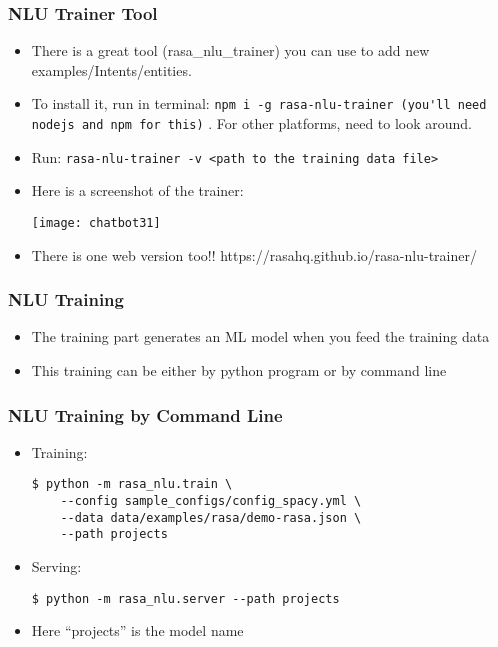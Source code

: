  \begin{frame}[fragile]\frametitle{NLU Trainer Tool}
\begin{itemize}
\item There is a great tool (rasa\_nlu\_trainer) you can use to add new examples/Intents/entities.
\item 
To install it, run in terminal: \lstinline|npm i -g rasa-nlu-trainer (you'll need nodejs and npm for this)| . For other platforms, need to look around. 
\item Run: \lstinline|rasa-nlu-trainer -v <path to the training data file>|
\item Here is a screenshot of the trainer:

\begin{center}
\texttt{[image: chatbot31]}
\end{center}

\item There is one web version too!! https://rasahq.github.io/rasa-nlu-trainer/
\end{itemize}

\end{frame}

 \begin{frame}[fragile]\frametitle{NLU Training}
\begin{itemize}
\item The training part generates an ML model when you feed the training data
\item This training can be either by python program or by command line
\end{itemize}

\end{frame}

 \begin{frame}[fragile]\frametitle{NLU Training by Command Line}
\begin{itemize}
\item Training:
\begin{lstlisting}
$ python -m rasa_nlu.train \
    --config sample_configs/config_spacy.yml \
    --data data/examples/rasa/demo-rasa.json \
    --path projects
\end{lstlisting}
\item Serving:
\begin{lstlisting}
$ python -m rasa_nlu.server --path projects
\end{lstlisting}
\item Here ``projects'' is the model name
\end{itemize}

\end{frame}

